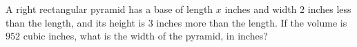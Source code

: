 A right rectangular pyramid has a base of length $x$ inches and width $2$ inches less than the length, and its height is $3$ inches more than the length. If the volume is $952$ cubic inches, what is the width of the pyramid, in inches?
